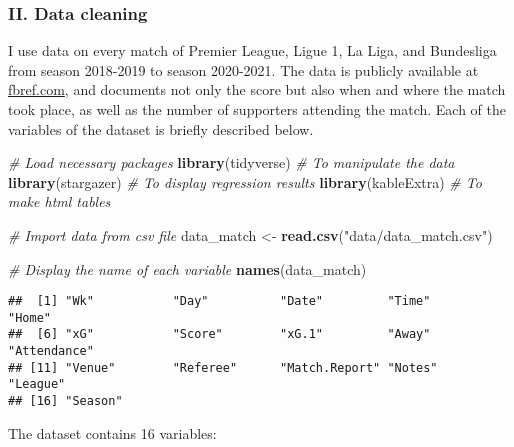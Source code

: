 \documentclass[
]{article}
\newenvironment{Shaded}{\begin{snugshade}}{\end{snugshade}}
\newcommand{\CommentTok}[1]{\textcolor[rgb]{0.56,0.35,0.01}{\textit{#1}}}
\newcommand{\KeywordTok}[1]{\textcolor[rgb]{0.13,0.29,0.53}{\textbf{#1}}}
\newcommand{\NormalTok}[1]{#1}
\newcommand{\StringTok}[1]{\textcolor[rgb]{0.31,0.60,0.02}{#1}}
\begin{document}
\hypertarget{ii.-data-cleaning}{%
\subsubsection{II. Data cleaning}\label{ii.-data-cleaning}}

I use data on every match of Premier League, Ligue 1, La Liga, and
Bundesliga from season 2018-2019 to season 2020-2021. The data is
publicly available at \href{https://fbref.com/}{fbref.com}, and
documents not only the score but also when and where the match took
place, as well as the number of supporters attending the match. Each of
the variables of the dataset is briefly described below.

\begin{Shaded}
\begin{Highlighting}[]
\CommentTok{# Load necessary packages}
\KeywordTok{library}\NormalTok{(tidyverse)  }\CommentTok{# To manipulate the data}
\KeywordTok{library}\NormalTok{(stargazer)  }\CommentTok{# To display regression results}
\KeywordTok{library}\NormalTok{(kableExtra) }\CommentTok{# To make html tables}

\CommentTok{# Import data from csv file}
\NormalTok{data_match <-}\StringTok{ }\KeywordTok{read.csv}\NormalTok{(}\StringTok{"data/data_match.csv"}\NormalTok{)}

\CommentTok{# Display the name of each variable}
\KeywordTok{names}\NormalTok{(data_match)}
\end{Highlighting}
\end{Shaded}

\begin{verbatim}
##  [1] "Wk"           "Day"          "Date"         "Time"         "Home"        
##  [6] "xG"           "Score"        "xG.1"         "Away"         "Attendance"  
## [11] "Venue"        "Referee"      "Match.Report" "Notes"        "League"      
## [16] "Season"
\end{verbatim}

The dataset contains 16 variables:
\end{document}
